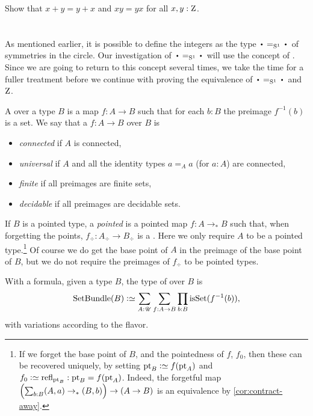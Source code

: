 \begin{xca}\label{xca:commutative-add-Z}
  Show that $x+y = y+x$ and $xy=yx$ for all $x,y:\mathrm{Z}$.
\end{xca}

\section{\Coverings}
\label{sec:covering}

As mentioned earlier, it is possible to define the integers as the
type $\base=_{\Sc}\base$ of symmetries in the circle.
Our investigation of $\base=_{\Sc}\base$ will use the concept of \coverings.
Since we are going to return to this concept several times,
we take the time for a fuller treatment before we continue with
proving the equivalence of $\base=_{\Sc}\base$ and $\mathrm{Z}$.

\begin{definition}\label{def:covering}
A \emph{\covering} over a type $B$
is a map $f:A\to B$ such that for each $b:B$ the preimage $f^{-1}(b)$ is a set.
We say that a \covering $f:A\to B$ over $B$ is
\begin{itemize}
\item \emph{connected} if $A$ is connected,
\item \emph{universal} if $A$ and all
the identity types $a=_Aa$ (for $a:A$) are connected,
\item \emph{finite} if all preimages are finite sets,
\item \emph{decidable} if all preimages are decidable sets.
\end{itemize}
If $B$ is a pointed type, a \emph{pointed} \covering is a pointed map $f:A\to_*B$ such that, when forgetting the points, $f_\div:A_\div\to B_\div$ is a \covering. Here we only
require $A$ to be a pointed type.\footnote{%
  If we forget the base point of $B$, and the pointedness of $f$, $f_0$,
  then these can be recovered uniquely, by setting $\pt_B \defeq f(\pt_A)$
  and $f_0 \defeq \refl{\pt_B} : \pt_B = f(\pt_A)$.
  Indeed, the forgetful map $\Bigl(\sum_{b:B}(A,a)\to_\ast(B,b)\Bigr)
  \to (A \to B)$ is an equivalence by \cref{cor:contract-away}.}
Of course we do get the base point of $A$ in the
preimage of the base point of $B$, but we do not require the preimages of $f_\div$
to be pointed types.
\end{definition}
With a formula, given a type $B$, the type of \coverings over $B$ is
\[
\SetBundle(B) \defeq \sum_{A:\UU}\sum_{f:A\to B}\prod_{b:B}\isset(f^{-1}(b)),
\]
with variations according to the flavor.

